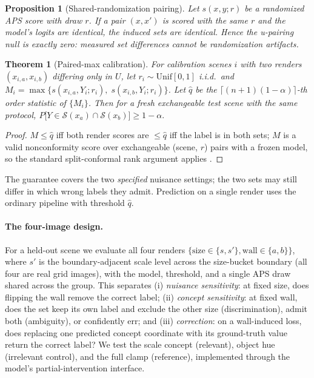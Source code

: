 \documentclass[11pt]{article}
\newtheorem{proposition}{Proposition}
\newtheorem{theorem}{Theorem}
\newcommand{\Sset}{\mathcal{S}}
\begin{document}
\begin{proposition}[Shared-randomization pairing]
\label{prop:shared-u}
Let $s(x,y;r)$ be a randomized APS score with draw $r$. If a pair
$(x, x')$ is scored with the same $r$ and the model's logits are identical,
the induced sets are identical. Hence the u-pairing null is exactly zero:
measured set differences cannot be randomization artifacts.
\end{proposition}

\begin{theorem}[Paired-max calibration]
\label{thm:paired}
For calibration scenes $i$ with two renders $(x_{i,a}, x_{i,b})$ differing only
in $U$, let $r_i \sim \mathrm{Unif}[0,1]$ i.i.d.\ and
$M_i = \max\{s(x_{i,a},Y_i;r_i),\; s(x_{i,b},Y_i;r_i)\}$. Let $\hat q$ be the
$\lceil (n{+}1)(1{-}\alpha)\rceil$-th order statistic of $\{M_i\}$. Then for a
fresh exchangeable test scene with the same protocol,
$P\big[Y \in \Sset(x_a) \cap \Sset(x_b)\big] \ge 1-\alpha.$
\end{theorem}

\begin{proof}
$M \le \hat q$ iff both render scores are $\le \hat q$ iff the label is in
both sets; $M$ is a valid nonconformity score over exchangeable
(scene, $r$) pairs with a frozen model, so the standard split-conformal rank
argument applies \citep{vovk2005algorithmic}.
\end{proof}

The guarantee covers the two \emph{specified} nuisance settings; the two sets
may still differ in which wrong labels they admit. Prediction on a single render
uses the ordinary pipeline with threshold $\hat q$.

\paragraph{The four-image design.} For a held-out scene we evaluate all four
renders $\{\text{size}\in\{s, s'\}, \text{wall}\in\{a, b\}\}$, where $s'$ is
the boundary-adjacent scale level across the size-bucket boundary (all four are
real grid images), with the model, threshold, and a single APS draw shared
across the group. This separates (i) \emph{nuisance sensitivity}: at fixed
size, does flipping the wall remove the correct label; (ii) \emph{concept
sensitivity}: at fixed wall, does the set keep its own label and exclude the
other size (discrimination), admit both (ambiguity), or confidently err; and
(iii) \emph{correction}: on a wall-induced loss, does replacing one predicted
concept coordinate with its ground-truth value return the correct label? We
test the scale concept (relevant), object hue (irrelevant control), and the
full clamp (reference), implemented through the model's partial-intervention
interface.
\end{document}
